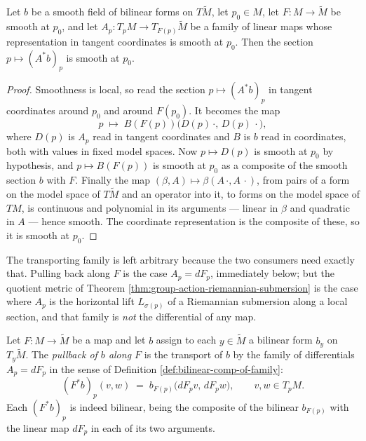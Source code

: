 \begin{lemma}
\label{lem:bilinear-comp-of-family-smooth}
\leanok
{}
Let $b$ be a smooth field of bilinear forms on $T\tilde{M}$, let $p_0 \in M$, let $F : M \to \tilde{M}$ be smooth at $p_0$, and let $A_p : T_pM \to T_{F(p)}\tilde{M}$ be a family of linear maps whose representation in tangent coordinates is smooth at $p_0$. Then the section $p \mapsto (A^*b)_p$ is smooth at $p_0$.
\end{lemma}

\begin{proof}
\leanok
{}
Smoothness is local, so read the section $p \mapsto (A^*b)_p$ in tangent coordinates around $p_0$ and around $F(p_0)$. It becomes the map
\[
  p \;\longmapsto\; B(F(p))\bigl(D(p)\,\cdot,\, D(p)\,\cdot\bigr),
\]
where $D(p)$ is $A_p$ read in tangent coordinates and $B$ is $b$ read in coordinates, both with values in fixed model spaces. Now $p \mapsto D(p)$ is smooth at $p_0$ by hypothesis, and $p \mapsto B(F(p))$ is smooth at $p_0$ as a composite of the smooth section $b$ with $F$. Finally the map $(\beta, A) \mapsto \beta(A\,\cdot, A\,\cdot)$, from pairs of a form on the model space of $T\tilde{M}$ and an operator into it, to forms on the model space of $TM$, is continuous and polynomial in its arguments --- linear in $\beta$ and quadratic in $A$ --- hence smooth. The coordinate representation is the composite of these, so it is smooth at $p_0$.
\end{proof}

The transporting family is left arbitrary because the two consumers need exactly that. Pulling back along $F$ is the case $A_p = dF_p$, immediately below; but the quotient metric of Theorem \ref{thm:group-action-riemannian-submersion} is the case where $A_p$ is the horizontal lift $L_{\sigma(p)}$ of a Riemannian submersion along a local section, and that family is \emph{not} the differential of any map.

\begin{definition}
\label{def:pullback-form-of-family}
\leanok
{}
Let $F : M \to \tilde{M}$ be a map and let $b$ assign to each $y \in \tilde{M}$ a bilinear form $b_y$ on $T_y\tilde{M}$. The \emph{pullback of $b$ along $F$} is the transport of $b$ by the family of differentials $A_p = dF_p$ in the sense of Definition \ref{def:bilinear-comp-of-family}:
\[
  (F^*b)_p(v,w) \;=\; b_{F(p)}\bigl(dF_p v,\, dF_p w\bigr), \qquad v,w \in T_pM .
\]
Each $(F^*b)_p$ is indeed bilinear, being the composite of the bilinear $b_{F(p)}$ with the linear map $dF_p$ in each of its two arguments.
\end{definition}

